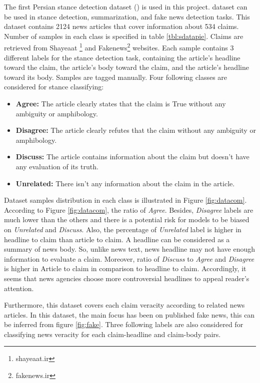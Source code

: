 The first Persian stance detection dataset (\cite{stance_persian})  is used in this project. \cite{stance_persian} dataset can be used in stance detection, summarization, and fake news detection tasks. This dataset contains 2124 news articles that cover information about 534 claims. Number of samples in each class is specified in table \ref{tbl:sdatapie}. Claims are retrieved from Shayeaat \footnote{shayeaat.ir} and Fakenews\footnote{fakenews.ir} websites. Each sample contains 3 different labels for the stance detection task, containing the article's headline toward the claim, the article's body toward the claim, and the article's headline toward its body. Samples are tagged manually. Four following classes are considered for stance classifying:
\begin{itemize}
	\item {\color{green!70!black}\textbf{Agree:}} The article clearly states that the claim is True without any ambiguity or amphibology. 
	\item {\color{red!70!black}\textbf{Disagree:}} The article clearly refutes that the claim without any ambiguity or amphibology. 
	\item {\color{yellow!70!black}\textbf{Discuss:}} The article contains information about the claim but doesn't have any evaluation of its truth. 
	\item {\color{gray!}\textbf{Unrelated:}} There isn't any information about the claim in the article.
\end{itemize}
Dataset samples distribution in each class is illustrated in Figure \ref{fig:datacom}. According to Figure \ref{fig:datacom}, the ratio of \textit{Agree}. Besides, \textit{Disagree} labels are much lower than the others and there is a potential risk for models to be biased on \textit{Unrelated} and \textit{Discuss}. Also, the percentage of \textit{Unrelated} label is higher in headline to claim than article to claim. A headline can be considered as a summary of news body. So, unlike news text, news headline may not have enough information to evaluate a claim.  Moreover, ratio of \textit{Discuss} to \textit{Agree} and \textit{Disagree} is higher in Article to claim in comparison to headline to claim. Accordingly, it seems that news agencies choose more controversial headlines to appeal reader's attention.

Furthermore, this dataset covers each claim veracity according to related news articles. In this dataset, the main focus has been on published fake news, this can be inferred from figure \ref{fig:fake}. Three following labels are also considered for classifying news veracity for each claim-headline and claim-body pairs.

